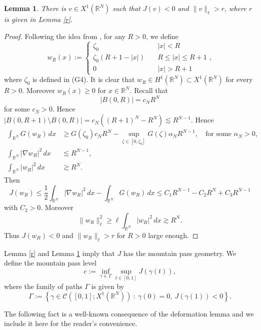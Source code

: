 \documentclass[12pt,leqno,twoside,sort]{amsart}
\newtheorem{Lem}[Th]{Lemma}
\newcommand{\R}{\mathbb{R}}
\newcommand{\cC}{{\mathcal C}}
\numberwithin{equation}{section}
\begin{document}
\begin{Lem}\label{v}
There is $v \in X^1 (\R^N)$ such that $J(v) < 0$ and $\|v\|_\ell > r$, where $r$ is given in Lemma \ref{r}.
\end{Lem}

\begin{proof}
Following the idea from \cite{BL}, for any $R > 0$, we define
$$
w_R(x) := \left\{ \begin{array}{ll}
\zeta_0 & \quad |x| < R \\
\zeta_0 (R+1-|x|) & \quad R \leq |x| \leq R+1 \\
0 & \quad |x| > R+1
\end{array} \right.,
$$
where $\zeta_0$ is defined in (G4).
It is clear that $w_R \in H^1 (\R^N) \subset X^1 (\R^N)$ for every $R > 0$. Moreover $w_R(x) \geq 0$ for $x \in \R^N$. Recall that
$$
| B(0, R) | = c_N R^N
$$
for some $c_N > 0$. Hence $| B(0,R+1) \setminus B(0,R) | = c_N \left( (R+1)^N - R^N \right) \lesssim  R^{N-1}$. Hence
\begin{align*}
\int_{\R^N} G(w_R) \, dx &\geq G(\zeta_0) c_N R^N - \sup_{\zeta \in [0, \zeta_0]} G(\zeta) \alpha_N R^{N-1}, \quad \mbox{for some } \alpha_N > 0, \\
\int_{\R^N} |\nabla w_R|^2 \, dx & \lesssim R^{N-1}, \\
\int_{\R^N} |w_R|^2 \, dx & \gtrsim R^N.
\end{align*}
Then
$$
J(w_R) \leq \frac12 \int_{\R^N} |\nabla w_R|^2 \, dx - \int_{\R^N} G(w_R) \, dx \leq C_1 R^{N-1} - C_2 R^{N} + C_3 R^{N-1}
$$
with $C_2 > 0$. Moreover 
$$
\| w_R \|_\ell^2 \geq \ell \int_{\R^N} |w_R|^2 \, dx \gtrsim R^N.
$$
Thus $J(w_R) < 0$ and $\|w_R\|_\ell > r$ for $R > 0$ large enough.
\end{proof}

Lemma \ref{r} and Lemma \ref{v} imply that $J$ has the mountain pass geometry. We define the mountain pass level
\begin{equation}\label{def:c}
c := \inf_{\gamma \in \Gamma} \sup_{t \in [0,1]} J(\gamma(t)),
\end{equation}
where the family of paths $\Gamma$ is given by
\begin{equation}\label{def:Gamma}
\Gamma := \left\{ \gamma \in \cC ([0,1]; X^1 (\R^N)) \ : \ \gamma(0) = 0, \ J(\gamma(1)) < 0 \right\}.
\end{equation}

The following fact is a well-known consequence of the deformation lemma and we include it here for the reader's convenience.
\end{document}
